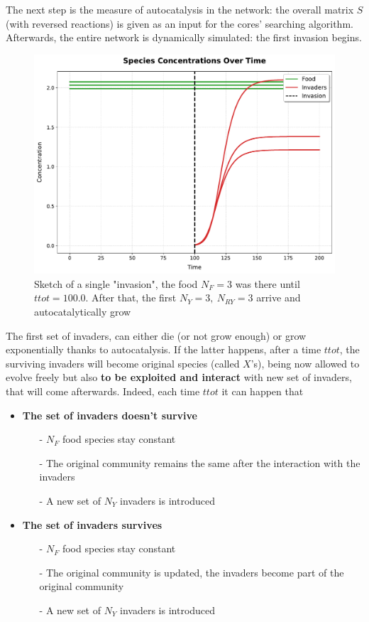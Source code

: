 \documentclass{article}
\begin{document}
The next step is the measure of autocatalysis in the network: the overall matrix $S$ (with reversed reactions) is given as an input for the cores' searching algorithm. Afterwards, the entire network is dynamically simulated: the first invasion begins.

\begin{figure}[H]
    \centering
    \includegraphics[width=0.6\linewidth]{Successive_species_concentrations.pdf} 
    \caption{\small{Sketch of a single "invasion", the food $N_F=3$ was there until $ttot=100.0$. After that, the first $N_Y=3, \ N_{RY}=3$ arrive and autocatalytically grow}}
    \label{Fig. 8}
\end{figure}

The first set of invaders, can either die (or not grow enough) or grow exponentially thanks to autocatalysis. If the latter happens, after a time $ttot$, the surviving invaders will become original species (called $X$'s), being now allowed to evolve freely but also \textbf{to be exploited and interact} with new set of invaders, that will come afterwards. Indeed, each time $ttot$ it can happen that

\begin{itemize}
    \item \textbf{The set of invaders doesn't survive}
    \begin{itemize}
        \item[-] $N_F$ food species stay constant
        \item[-] The original community remains the same after the interaction with the invaders
        \item[-] A new set of $N_Y$ invaders is introduced
    \end{itemize}
    \item \textbf{The set of invaders survives}
     \begin{itemize}
        \item[-] $N_F$ food species stay constant
        \item[-] The original community is updated, the invaders become part of the original community
        \item[-] A new set of $N_Y$ invaders is introduced
    \end{itemize}
\end{itemize}
\end{document}
